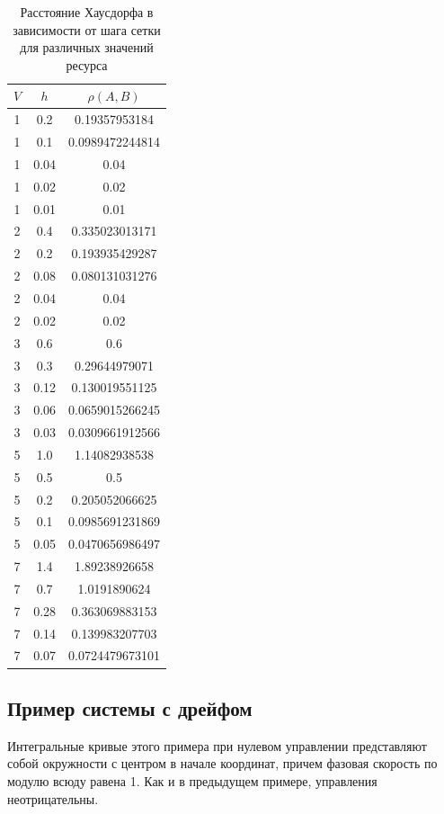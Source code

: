 \begin{table}[f]
  \centering
  \begin{tabular}{|*{3}{c|}}
    $V$&$h$&$\rho(A,B)$\\ \hline
    1&0.2&0.19357953184\\
    1&0.1&0.0989472244814\\
    1&0.04&0.04\\
    1&0.02&0.02\\
    1&0.01&0.01\\
    2&0.4&0.335023013171\\
    2&0.2&0.193935429287\\
    2&0.08&0.080131031276\\
    2&0.04&0.04\\
    2&0.02&0.02\\
    3&0.6&0.6\\
    3&0.3&0.29644979071\\
    3&0.12&0.130019551125\\
    3&0.06&0.0659015266245\\
    3&0.03&0.0309661912566\\
    5&1.0&1.14082938538\\
    5&0.5&0.5\\
    5&0.2&0.205052066625\\
    5&0.1&0.0985691231869\\
    5&0.05&0.0470656986497\\
    7&1.4&1.89238926658\\
    7&0.7&1.0191890624\\
    7&0.28&0.363069883153\\
    7&0.14&0.139983207703\\
    7&0.07&0.0724479673101\\
  \end{tabular}
  \caption{Расстояние Хаусдорфа в зависимости от шага сетки для
    различных значений ресурса}
  \label{tab:hsd_ndft}
\end{table}

\pagebreak
\subsection{Пример системы с дрейфом}
\label{sec:swd}

Интегральные кривые этого примера при нулевом управлении
представляют собой окружности с центром в начале координат, причем
фазовая скорость по модулю всюду равена 1. Как и в предыдущем примере,
управления неотрицательны.

